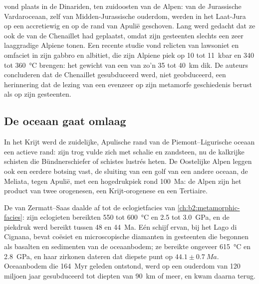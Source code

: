  vond plaats in de Dinariden, ten zuidoosten van de Alpen:  van de Jurassische
Vardaroceaan, zelf van Midden-Jurassische ouderdom, werden in het Laat-Jura op een
accretiewig en op de rand van Apulië geschoven. Lang werd gedacht dat ze ook de
 van de Chenaillet had geplaatst, omdat zijn gesteenten slechts een zeer laaggradige Alpiene
 tonen. Een recente studie vond relicten van lawsoniet en omfaciet in zijn gabbro en
albitiet, die zijn Alpiene piek op 10 tot \qty{11}{kbar} en 340 tot
\qty{360}{\celsius} brengen: het gewicht van een  van zo'n 35 tot \qty{40}{km} dik. De auteurs
concluderen dat de Chenaillet gesubduceerd werd, niet geobduceerd, een herinnering dat de lezing van
een  evenzeer op zijn metamorfe geschiedenis berust als op zijn gesteenten.

\subsection*{De oceaan gaat omlaag}

In het Krijt werd de zuidelijke, Apulische rand van de Piemont--Ligurische oceaan een
actieve rand: zijn trog vulde zich met schalie en zandsteen, nu de kalkrijke schisten
die Bündnerschiefer of schistes lustrés heten. De Oostelijke Alpen leggen ook een eerdere
botsing vast, de sluiting van een golf van een andere oceaan, de Meliata, tegen Apulië, met een
hogedrukpiek rond \qty{100}{Ma}: de Alpen zijn het product van twee orogenesen, een
Krijt-orogenese en een Tertiaire.

De  van Zermatt--Saas daalde af tot de eclogietfacies van
\cref{ch:b2:metamorphic-facies}: zijn eclogieten bereikten 550 tot \qty{600}{\celsius} en 2.5 tot
\qty{3.0}{GPa}, en de piekdruk werd bereikt tussen 48 en \qty{44}{Ma}. Eén schijf ervan,
bij het Lago di Cignana, bevat coësiet en microscopische diamanten in gesteenten die begonnen als basalten
en sedimenten van de oceaanbodem; ze bereikte ongeveer \qty{615}{\celsius} en \qty{2.8}{GPa}, en haar
zirkonen dateren dat diepste punt op $44.1 \pm \qty{0.7}{Ma}$. Oceaanbodem die
\qty{164}{Myr} geleden ontstond, werd op een ouderdom van 120 miljoen jaar gesubduceerd tot diepten van
\qty{90}{km} of meer, en kwam daarna terug.

